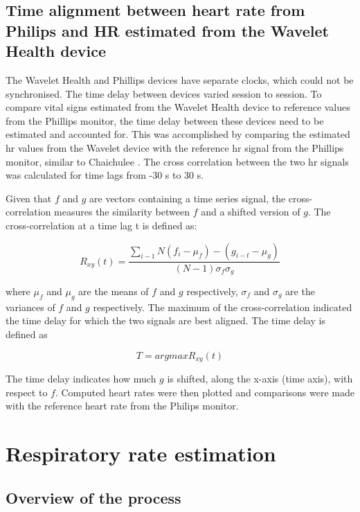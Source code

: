 \subsection{Time alignment between heart rate from Philips and HR estimated from the Wavelet Health device}

The Wavelet Health and Phillips devices have separate clocks, which could not be synchronised. The time delay between devices varied session to session. To compare vital signs estimated from the Wavelet Health device to reference values from the Phillips monitor, the time delay between these devices need to be estimated and accounted for. This was accomplished by comparing the estimated \gls{hr} values from the Wavelet device with the reference \gls{hr} signal from the Phillips monitor, similar to Chaichulee \cite{chaichulee2018non}. The cross correlation between the two \gls{hr} signals was calculated for time lags from -30 s to 30 s. 

Given that $f$ and $g$ are vectors containing a time series signal, the cross-correlation measures the similarity between $f$ and a shifted version of $g$. The cross-correlation at a time lag t is defined as:

\begin{equation}
	R_{xy}(t) =\dfrac{\sum_{i-1}N(f_{i} - μ_{f}) - (g_{i-t} - μ_{g})}{(N-1) σ_{f}σ_{g}}
\end{equation}

where $μ_{f}$ and $μ_{g}$ are the means of $f$ and $g$ respectively, $σ_{f}$ and $σ_{g}$ are the variances of $f$ and $g$ respectively. The maximum of the cross-correlation indicated the time delay for which the two signals are best aligned. The time delay is defined as

\begin{equation}
  T = argmax R_{xy}(t)
\end{equation}

The time delay indicates how much $g$ is shifted, along the x-axis (time axis), with respect to $f$. Computed heart rates were then plotted and comparisons were made with the reference heart rate from the Philips monitor. 

\section{Respiratory rate estimation}
\subsection{Overview of the process}


